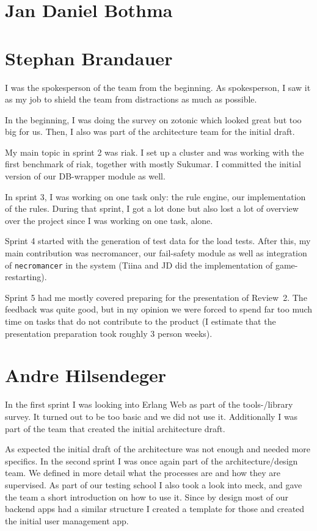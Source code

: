 \documentclass[11pt,a4paper]{report}
\begin{document}
\section{Jan Daniel Bothma}
\section{Stephan Brandauer}
I was the spokesperson of the team from the beginning. As spokesperson,
I saw it as my job to shield the team from distractions as much as possible.

In the beginning, I was doing the survey on zotonic which looked great but too
big for us. Then, I also was part of the architecture team for the initial
draft.

My main topic in sprint 2 was riak. I set up a cluster and was working with the
first benchmark of riak, together with mostly Sukumar.
I committed the initial version of our DB-wrapper module as well.

In sprint 3, I was working on one task only: the rule engine, our implementation
of the rules. During that sprint, I got a lot done but also lost a lot of
overview over the project since I was working on one task, alone.

Sprint 4 started with the generation of test data for the load tests. After
this, my main contribution was necromancer, our fail-safety module as well as
integration of {\tt necromancer} in the system (Tiina and JD did the
implementation of game-restarting).

Sprint 5 had me mostly covered preparing for the presentation of Review~2.
The feedback was quite good, but in my opinion we were forced to spend far too
much time on tasks that do not contribute to the product (I estimate that the
presentation preparation took roughly 3 person weeks).

\section{Andre Hilsendeger}
In the first sprint I was looking into Erlang Web as part of the tools-/library survey.
It turned out to be too basic and we did not use it.
Additionally I was part of the team that created the initial architecture draft.

As expected the initial draft of the architecture was not enough and needed more specifics.
In the second sprint I was once again part of the architecture/design team.
We defined in more detail what the processes are and how they are supervised.
As part of our testing school I also took a look into meck, and gave the team a short introduction
on how to use it.
Since by design most of our backend apps had a similar structure I created a template for those
and created the initial user management app.
\end{document}
